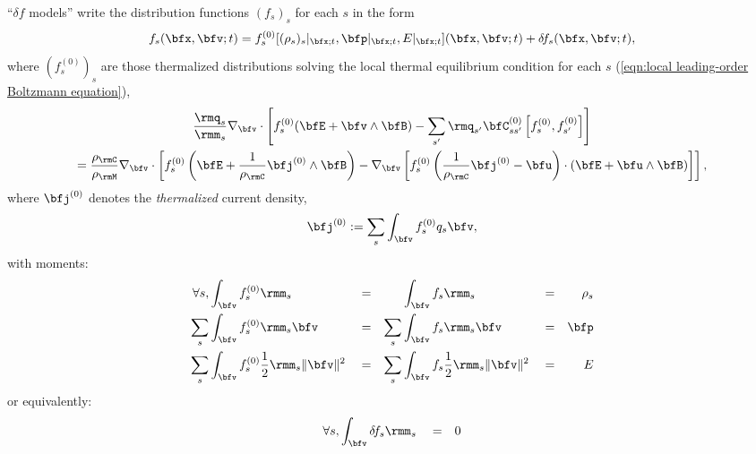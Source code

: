     \begin{definition}\label{def:delta f models}
        ``$\delta\!f$ models'' write the distribution functions $(f_{s})_{s}$ for each $s$ in the form
        \begin{equation}
            f_{s}(\bfx, \bfv; t)  =  f_{s}^{(0)}[(\rho_{s})_{s}|_{\bfx; t}, \bfp|_{\bfx; t}, E|_{\bfx; t}](\bfx, \bfv; t) + \delta\!f_{s}(\bfx, \bfv; t),
        \end{equation}
        where $\left(f_{s}^{(0)}\right)_{s}$ are those thermalized distributions solving the local thermal equilibrium condition for each $s$ (\ref{eqn:local leading-order Boltzmann equation}),
        \begin{multline}\label{eqn:thermal equilibrium identity}
            \frac{\rmq_{s}}{\rmm_{s}}\nabla_{\bfv}\cdot\left[f_{s}^{(0)}(\bfE + \bfv\wedge\bfB) - \sum_{s'}\rmq_{s'}\bfC_{ss'}^{(0)}\left[f_{s}^{(0)}, f_{s'}^{(0)}\right]\right]  \\
            =  \frac{\rho_{\rmC}}{\rho_{\rmM}}\nabla_{\bfv}\cdot\left[f_{s}^{(0)}\left(\bfE + \frac{1}{\rho_{\rmC}}\bfj^{(0)}\wedge\bfB\right) - \nabla_{\bfv}\left[f_{s}^{(0)}\left(\frac{1}{\rho_{\rmC}}\bfj^{(0)} - \bfu\right)\cdot\left(\bfE + \bfu\wedge\bfB\right)\right]\right],
        \end{multline}
        where $\bfj^{(0)}$ denotes the \emph{thermalized} current density,
        \begin{equation}\label{eqn:thermalized current density}
            \bfj^{(0)}  :=  \sum_{s}\int_{\bfv}f_{s}^{(0)}q_{s}\bfv,
        \end{equation}
        with moments:
        \begin{align}
            \forall s,          &\int_{\bfv}f_{s}^{(0)}\rmm_{s}                         &  &=  &          &\int_{\bfv}f_{s}\rmm_{s}                         &  &=  &  \rho_{s}  \\
                        \sum_{s}&\int_{\bfv}f_{s}^{(0)}\rmm_{s}\bfv                     &  &=  &  \sum_{s}&\int_{\bfv}f_{s}\rmm_{s}\bfv                     &  &=  &  \bfp  \\
                        \sum_{s}&\int_{\bfv}f_{s}^{(0)}\frac{1}{2}\rmm_{s}\|\bfv\|^{2}  &  &=  &  \sum_{s}&\int_{\bfv}f_{s}\frac{1}{2}\rmm_{s}\|\bfv\|^{2}  &  &=  &  E
        \end{align}
        or equivalently:
        \begin{align}
            \forall s,          &\int_{\bfv}\delta\!f_{s}\rmm_{s}                         &  &=  &  0    \label{eqn:correction mass moment}  \\

\end{align}
\end{definition}
